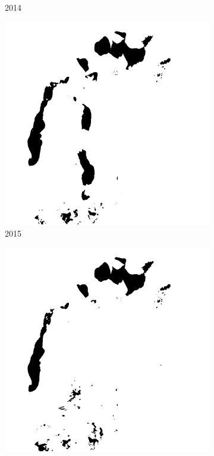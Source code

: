 \documentclass[12pt,a4paper]{article}
\begin{document}
\begin{figure}
\begin{subfigure}[b]{0.19\textwidth}
        \caption{2014}
    \end{subfigure}
    \begin{subfigure}[b]{0.19\textwidth}
        \centering
        \includegraphics[width=\textwidth]{../img/2015w.jpg}
        \caption{2015}
    \end{subfigure}
    \begin{subfigure}[b]{0.19\textwidth}
        \centering
        \includegraphics[width=\textwidth]{../img/2019w.jpg}

\end{subfigure}
\end{figure}
\end{document}
